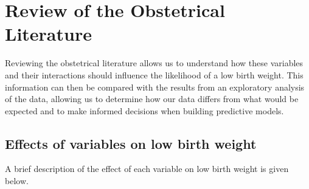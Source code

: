 \section*{Review of the Obstetrical Literature}
Reviewing the obstetrical literature allows us to understand how these variables and their interactions should influence the likelihood of a low birth weight. This information can then be compared with the results from an exploratory analysis of the data, allowing us to determine how our data differs from what would be expected and to make informed decisions when building predictive models.

\subsection{Effects of variables on low birth weight}
A brief description of the effect of each variable on low birth weight is given below.
